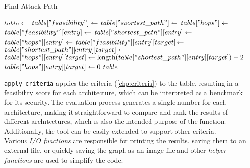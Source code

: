 \begin{algorithm}[h]
    \caption{Find Attack Path}
    \label{alg:findattackpath}
    \begin{algorithmic}[1]
        \State $table \gets$ 
        \State $table["feasibility"] \gets$ 
        \State $table["shortest\_path"] \gets$ 
        \State $table["hops"] \gets$ 
            \State $table["feasibility"][entry] \gets$ 
            \State $table["shortest\_path"][entry] \gets$ 
            \State $table["hops"][entry] \gets$ 
                \State $table["feasibility"][entry][target] \gets$ 
                \State $table["shortest\_path"][entry][target] \gets$ 
                    \State $table["hops"][entry][target] \gets \text{length}(table["shortest\_path"][entry][target]) - 2$
                \Else
                    \State $table["hops"][entry][target] \gets 0$
                \EndIf
            \EndFor
        \EndFor
        \State \Return $table$
    \EndProcedure
    \end{algorithmic}
\end{algorithm}
    
\texttt{apply\_criteria} applies the criteria (\ref{chp:criteria}) to the table, 
resulting in a feasibility score for each architecture, 
which can be interpreted as a benchmark for its security. 
The evaluation process generates a single number for each architecture, 
making it straightforward to compare and rank the results of different architectures, 
which is also the intended purpose of the function. 
Additionally, the tool can be easily extended to support other criteria.\\

Various \textit{I/O functions} are responsible for printing the results, saving them to an external file, or quickly saving the graph as an image file
and other \textit{helper functions} are used to simplify the code.

\newpage

